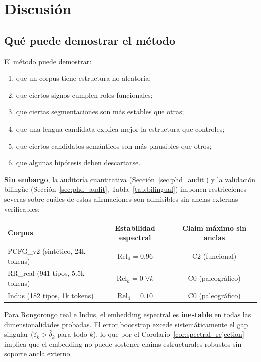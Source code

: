 \documentclass[11pt,a4paper]{article}
\newcommand{\1}{\mathbf{1}}
\numberwithin{equation}{section}
\begin{document}
\section{Discusión}

\subsection{Qué puede demostrar el método}

El método puede demostrar:
\begin{enumerate}[label=(\roman*)]
    \item que un corpus tiene estructura no aleatoria;
    \item que ciertos signos cumplen roles funcionales;
    \item que ciertas segmentaciones son más estables que otras;
    \item que una lengua candidata explica mejor la estructura que controles;
    \item que ciertos candidatos semánticos son más plausibles que otros;
    \item que algunas hipótesis deben descartarse.
\end{enumerate}

\textbf{Sin embargo}, la auditoría cuantitativa (Sección~\ref{sec:phd_audit}) y la validación bilingüe (Sección~\ref{sec:phd_audit}, Tabla~\ref{tab:bilingual}) imponen restricciones severas sobre cuáles de estas afirmaciones son admisibles sin anclas externas verificables:

\begin{center}
\begin{tabular}{lcc}
\toprule
Corpus & Estabilidad espectral & Claim máximo sin anclas \\
\midrule
PCFG\_v2 (sintético, 24k tokens) & $\mathrm{Rel}_4 = 0.96$ & C2 (funcional) \\
RR\_real (941 tipos, 5.5k tokens) & $\mathrm{Rel}_k = 0 \;\forall k$ & C0 (paleográfico) \\
Indus (182 tipos, 1k tokens) & $\mathrm{Rel}_4 = 0.10$ & C0 (paleográfico) \\
\bottomrule
\end{tabular}
\end{center}

Para Rongorongo real e Indus, el embedding espectral es \textbf{inestable} en todas las dimensionalidades probadas. El error bootstrap excede sistemáticamente el gap singular ($\widehat\varepsilon_k > \widehat\delta_k$ para todo $k$), lo que por el Corolario~\ref{cor:spectral_rejection} implica que el embedding no puede sostener claims estructurales robustos sin soporte ancla externo.
\end{document}
